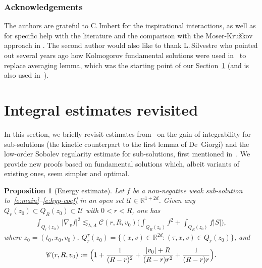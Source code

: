 \documentclass[10pt]{amsart}
\let\mathcal\mathscr
\newtheorem{proposition}[theorem]{Proposition}
\theoremstyle{definition}
\theoremstyle{remark}
\newcommand\R{{\mathbb R}}
\newcommand{\cC}{\mathcal C}
\newcommand{\cU}{\mathcal{U}}
\begin{document}
\subsubsection*{Acknowledgements} The authors are grateful to
C.\,Imbert for the inspirational interactions, as well as for
specific help with the literature and the comparison with the
Moser-Kru\v{z}kov approach in \cite{Guerand-Imbert}. The second
author would also like to thank L.\,Silvestre who pointed out
several years ago how Kolmogorov fundamental solutions were used
in~\cite{pp} to replace averaging lemma, which was the starting
point of our Section~\ref{sec:int} (and is also used
in~\cite{MR4049224}).


\section{Integral estimates revisited}
\label{sec:int}

In this section, we briefly revisit estimates from~\cite{pp,gimv}
on the gain of inte\-grability for sub-solutions (the kinetic
counterpart to the first lemma of De~Giorgi) and the low-order
Sobolev regularity estimate for sub-solutions, first mentioned
in~\cite{gimv}. We provide new proofs based on fundamental
solutions which, albeit variants of existing ones, seem simpler
and optimal.


\begin{proposition}[Energy estimate]
\label{prop:EE}
Let $f$ be a non-negative weak sub-solution
to~\eqref{e:main}--\eqref{e:hyp-coef} in an open set
$\cU \in \R^{1+2d}$. Given any
$Q_r(z_0) \subset Q_R(z_0) \subset \cU$ with $0<r<R$, one has
\begin{align*}
\int_{Q_r(z_0)} |\nabla_v f|^2
\lesssim_{\lambda,\Lambda} \cC(r,R,v_0) \biggl(
\int_{Q_R(z_0)} f^2 + \int_{Q_R(z_0)} f |S| \biggr),
\end{align*}
where $z_0=(t_0,x_0,v_0)$,
$Q_r^\tau (z_0) = \{(x,v)\in\R^{2d} :(\tau,x,v)\in
Q_r(z_0) \} $, and
\begin{equation}
\label{eq:C}
\cC(r,R,v_0) := \Bigl( 1 + \frac{1}{(R-r)^2} +
\frac{|v_0|+R}{(R-r)r^2} +\frac{1}{(R-r)r} \Bigr).
\end{equation}
\end{proposition}
\end{document}
